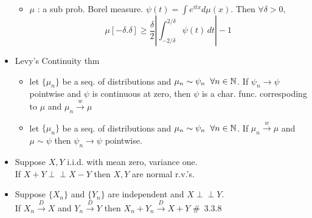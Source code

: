 \documentclass[12pt, A4]{article}
\newcommand{\indep}{\perp \!\!\! \perp}
\begin{document}
\begin{itemize}
	\begin{itemize}
		\item $\mu$ : a sub prob. Borel measure. $\psi(t)=\int e^{itx}d\mu(x)$. Then $\forall \delta>0,$ $$\mu{[-\delta. \delta]}\geq \frac{\delta}{2}\left|\int_{-2/\delta}^{2/\delta}\psi(t)\,dt\right|-1$$
	\end{itemize}
	\item Levy's Continuity thm
	\begin{itemize}
		\item let $\{\mu_n\}$ be a seq. of distributions and $\mu_n \sim \psi_n \hspace{0.2cm} \forall n\in \mathbb{N}$.
		\newline If $\psi_n \rightarrow \psi$ pointwise and $\psi$ is continuous at zero, \newline then $\psi$ is a char. func. correspoding to $\mu$ and $\mu_n \xrightarrow{w} \mu$
		\item let $\{\mu_n\}$ be a seq. of distributions and $\mu_n \sim \psi_n \hspace{0.2cm} \forall n\in \mathbb{N}$.
		\newline If $\mu_n\xrightarrow{w} \mu$ and $\mu \sim \psi$ then $\psi_n \rightarrow \psi$ pointwise.
	\end{itemize}
	\item Suppose $X,Y$ i.i.d. with mean zero, variance one. \\If $X+Y\indep X-Y$ then $X,Y$ are normal r.v.'s.
	\item Suppose $\{X_n\}$ and $\{Y_n\}$ are independent and $X\indep Y$. \\If $X_n\xrightarrow{D} X$ and $Y_n\xrightarrow{D}Y$ then $X_n+Y_n\xrightarrow{D}X+Y$ \quad \#\ 3.3.8 
\end{itemize}

\bigskip
\end{document}
